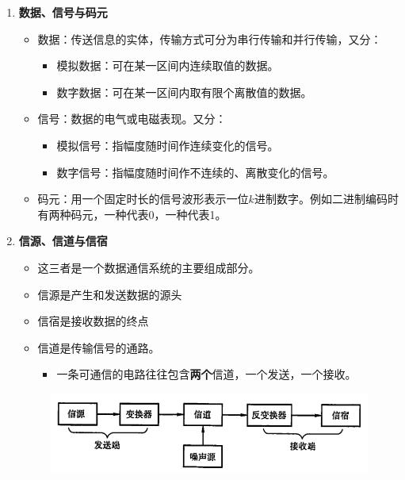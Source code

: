 \documentclass[12pt, a4paper, oneside]{ctexart}
\begin{document}
\begin{enumerate}
    \item {\bf 数据、信号与码元}
    \begin{itemize}
        \item 数据：传送信息的实体，传输方式可分为串行传输和并行传输，又分：
        \begin{itemize}
            \item 模拟数据：可在某一区间内连续取值的数据。
            \item 数字数据：可在某一区间内取有限个离散值的数据。
        \end{itemize}
        \item 信号：数据的电气或电磁表现。又分：
        \begin{itemize}
            \item 模拟信号：指幅度随时间作连续变化的信号。
            \item 数字信号：指幅度随时间作不连续的、离散变化的信号。
        \end{itemize}
        \item 码元：用一个固定时长的信号波形表示一位$k$进制数字。例如二进制编码时有两种码元，一种代表0，一种代表1。
    \end{itemize}
    \item {\bf 信源、信道与信宿}
    \begin{itemize}
        \item 这三者是一个数据通信系统的主要组成部分。
        \item 信源是产生和发送数据的源头
        \item 信宿是接收数据的终点
        \item 信道是传输信号的通路。
        \begin{itemize}
            \item 一条可通信的电路往往包含\textbf{两个}信道，一个发送，一个接收。
        \end{itemize}
    \end{itemize}
    \begin{figure}[h]
        \centering
        \includegraphics[scale=1]{./images/single_communication_system.png}

\end{figure}
\end{enumerate}
\end{document}
